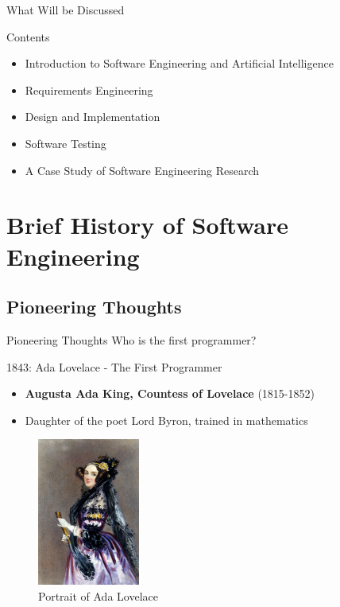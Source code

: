 \documentclass{beamer}
\begin{document}
\begin{frame}[t]{What Will be Discussed}
    \begin{block}{Contents}
        \begin{itemize}
            \item Introduction to Software Engineering and Artificial Intelligence
            \item Requirements Engineering
            \item Design and Implementation
            \item Software Testing 
            \item A Case Study of Software Engineering Research
        \end{itemize}
    \end{block}
\end{frame}

\section{Brief History of Software Engineering}
\subsection{Pioneering Thoughts}

\begin{frame}[t]{Pioneering Thoughts}
    \Huge
    Who is the first programmer?
\end{frame}

\begin{frame}[t]{1843: Ada Lovelace - The First Programmer}
        \begin{itemize}
            \item \textbf{Augusta Ada King, Countess of Lovelace} (1815-1852)
            \item Daughter of the poet Lord Byron, trained in mathematics
        \end{itemize}
        \begin{figure}[b]
            \centering
            \includegraphics[width=0.3\textwidth]{images/Ada_Lovelace_portrait.jpg}
            \caption{Portrait of Ada Lovelace}
        \end{figure}
\end{frame}
\end{document}
